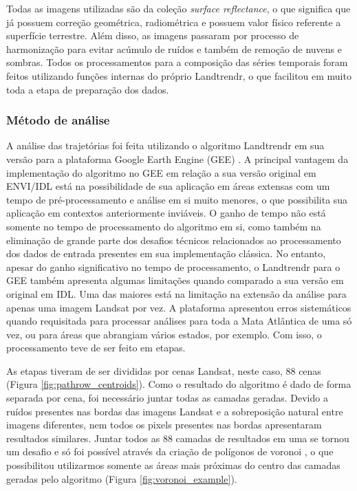 Todas as imagens utilizadas são da coleção \emph{surface reflectance}, o que significa que já possuem correção geométrica, radiométrica e possuem valor físico referente a superfície terrestre. Além disso, as imagens passaram por processo de harmonização para evitar acúmulo de ruídos e também de remoção de nuvens e sombras. Todos os processamentos para a composição das séries temporais foram feitos utilizando funções internas do próprio Landtrendr, o que facilitou em muito toda a etapa de preparação dos dados.

\subsubsection{Método de análise}
\hspace{13pt} A análise das trajetórias foi feita utilizando o algoritmo Landtrendr em sua versão para a plataforma Google Earth Engine (GEE) \citep{Kennedy2018}. A principal vantagem da implementação do algoritmo no GEE em relação a sua versão original em ENVI/IDL está na possibilidade de sua aplicação em áreas extensas com um tempo de pré-processamento e análise em si muito menores, o que possibilita sua aplicação em contextos anteriormente inviáveis. O ganho de tempo não está somente no tempo de processamento do algoritmo em si, como também na eliminação de grande parte dos desafios técnicos relacionados ao processamento dos dados de entrada presentes em sua implementação clássica. No entanto, apesar do ganho significativo no tempo de processamento, o Landtrendr para o GEE também apresenta algumas limitações quando comparado a sua versão em original em IDL. Uma das maiores está na limitação na extensão da análise para apenas uma imagem Landsat por vez. A plataforma apresentou erros sistemáticos quando requisitada para processar análises para toda a Mata Atlântica de uma só vez, ou para áreas que abrangiam vários estados, por exemplo. Com isso, o processamento teve de ser feito em etapas. 

As etapas tiveram de ser divididas por cenas Landsat, neste caso, 88 cenas (Figura \ref{fig:pathrow_centroids}). Como o resultado do algoritmo é dado de forma separada por cena, foi necessário juntar todas as camadas geradas. Devido a ruídos presentes nas bordas das imagens Landsat e a sobreposição natural entre imagens diferentes, nem todos os pixels presentes nas bordas apresentaram resultados similares. Juntar todos as 88 camadas de resultados em uma se tornou um desafio e só foi possível através da criação de polígonos de voronoi \citep{Okabe}, o que possibilitou utilizarmos somente as áreas mais próximas do centro das camadas geradas pelo algoritmo (Figura \ref{fig:voronoi_example}).

